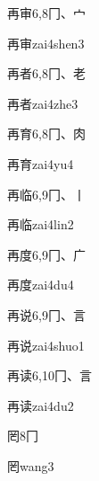 \begin{entry}{再审}{6,8}{⼌、⼧}
  \begin{phonetics}{再审}{zai4shen3}
  \end{phonetics}
\end{entry}

\begin{entry}{再者}{6,8}{⼌、⽼}
  \begin{phonetics}{再者}{zai4zhe3}
  \end{phonetics}
\end{entry}

\begin{entry}{再育}{6,8}{⼌、⾁}
  \begin{phonetics}{再育}{zai4yu4}
  \end{phonetics}
\end{entry}

\begin{entry}{再临}{6,9}{⼌、⼁}
  \begin{phonetics}{再临}{zai4lin2}
  \end{phonetics}
\end{entry}

\begin{entry}{再度}{6,9}{⼌、⼴}
  \begin{phonetics}{再度}{zai4du4}
  \end{phonetics}
\end{entry}

\begin{entry}{再说}{6,9}{⼌、⾔}
  \begin{phonetics}{再说}{zai4shuo1}
  \end{phonetics}
\end{entry}

\begin{entry}{再读}{6,10}{⼌、⾔}
  \begin{phonetics}{再读}{zai4du2}
  \end{phonetics}
\end{entry}

\begin{entry}{罔}{8}{⼌}
  \begin{phonetics}{罔}{wang3}
  \end{phonetics}
\end{entry}


